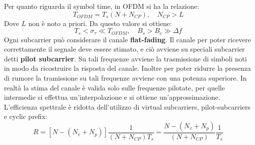 Per quanto riguarda il symbol time, in OFDM si ha la relazione:
\[
    T_{OFDM} = T_s(N+N_{CP}), \quad N_{CP} > L
\]  
Dove $L$ non è noto a priori.
Da questo valore si ottiene:
\[
    T_s < \sigma_{\tau} \ll T_{OFDM}, \quad B_s > B_c \gg \Delta f
\]
Ogni subcarrier può considerare il canale \textbf{flat-fading}. Il canale per poter ricevere correttamente il segnale deve essere stimato, e ciò avviene su speciali subcarrier detti \textbf{pilot subcarrier}. Su tali frequenze avviene la trasmissione di simboli noti in modo da ricostruire la risposta del canale. Inoltre per poter ridurre la presenza di rumore la tramissione su tali frequenze avviene con una potenza superiore. In realtà la stima del canale è valida solo sulle frequenze pilotate, per quelle intermedie si effettua un'interpolazione e si ottiene un'approssimazione.
L'efficienza spettrale è ridotta dell'utilizzo di virtual subcarriers, pilot-subcarriers e cyclic prefix:
\[
    R = \left[N - (N_v + N_p) \right]\frac{1}{(N+N_{CP})T_s} = \frac{N - (N_v + N_p)}{(N+N_{CP})} \frac{1}{T_s}
\]



\makeatletter
{}
\makeatother

